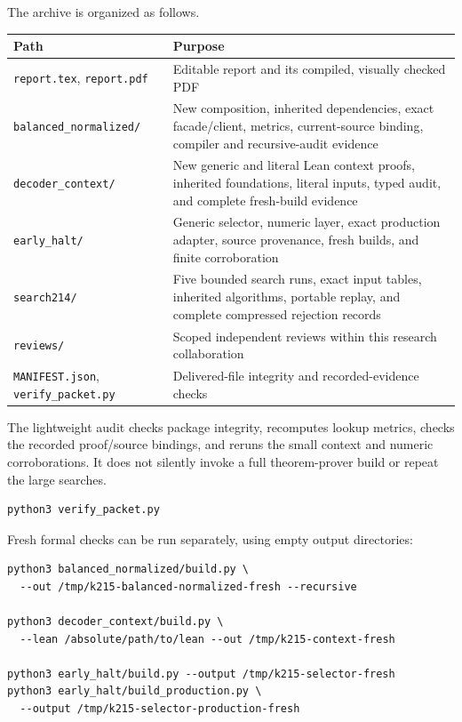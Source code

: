 \documentclass[11pt]{article}
\newcommand{\code}[1]{\texttt{#1}}
\theoremstyle{remark}
\begin{document}
The archive is organized as follows.

\begin{center}
\small
\begin{tabular}{p{48mm}p{91mm}}
\toprule
Path & Purpose\\
\midrule
\code{report.tex}, \code{report.pdf} &
Editable report and its compiled, visually checked PDF\\
\code{balanced\_normalized/} &
New composition, inherited dependencies, exact facade/client,
metrics, current-source binding, compiler and recursive-audit evidence\\
\code{decoder\_context/} &
New generic and literal Lean context proofs, inherited foundations,
literal inputs, typed audit, and complete fresh-build evidence\\
\code{early\_halt/} &
Generic selector, numeric layer, exact production adapter, source
provenance, fresh builds, and finite corroboration\\
\code{search214/} &
Five bounded search runs, exact input tables, inherited algorithms,
portable replay, and complete compressed rejection records\\
\code{reviews/} &
Scoped independent reviews within this research collaboration\\
\code{MANIFEST.json}, \code{verify\_packet.py} &
Delivered-file integrity and recorded-evidence checks\\
\bottomrule
\end{tabular}
\end{center}

The lightweight audit checks package integrity, recomputes lookup metrics,
checks the recorded proof/source bindings, and reruns the small context and
numeric corroborations. It does not silently invoke a full theorem-prover
build or repeat the large searches.

\begin{lstlisting}
python3 verify_packet.py
\end{lstlisting}

Fresh formal checks can be run separately, using empty output directories:

\begin{lstlisting}
python3 balanced_normalized/build.py \
  --out /tmp/k215-balanced-normalized-fresh --recursive

python3 decoder_context/build.py \
  --lean /absolute/path/to/lean --out /tmp/k215-context-fresh

python3 early_halt/build.py --output /tmp/k215-selector-fresh
python3 early_halt/build_production.py \
  --output /tmp/k215-selector-production-fresh
\end{lstlisting}
\end{document}
